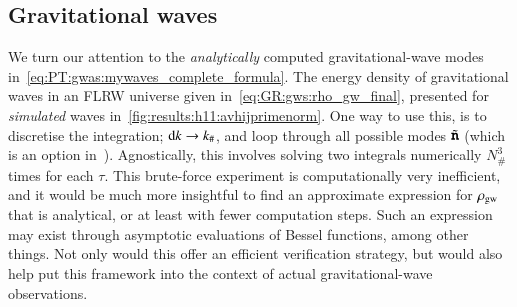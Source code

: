 \subsection{Gravitational waves}\label{sec:whatif:cont:gws}

We turn our attention to the \emph{analytically} computed gravitational-wave modes in~\cref{eq:PT:gwas:mywaves_complete_formula}. 
The energy density of gravitational waves in an FLRW universe given in~\cref{eq:GR:gws:rho_gw_final}, presented for \emph{simulated} waves in~\cref{fig:results:h11:avhijprimenorm}. 
One way to use this, is to discretise the integration; $\diff k \to k_\#$, and loop through all possible modes $\tilde{\boldsymbol{\mathtt{n}}}$ (which is an option in~\asgrd{}). Agnostically, this involves solving two integrals numerically $N_\#^3$ times for each $\tau$. This brute-force experiment is computationally very inefficient, and it would be much more insightful to find an approximate expression for $\rho_\mathrm{gw}$ that is analytical, or at least with fewer computation steps. %
Such an expression may exist through asymptotic evaluations of Bessel functions, among other things. Not only would this offer an efficient verification strategy, but would also help put this framework into the context of actual gravitational-wave observations.

